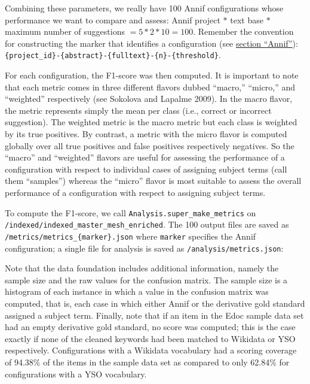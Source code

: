 Combining these parameters, we really have 100 Annif configurations
whose performance we want to compare and assess: Annif project \(*\)
text base \(*\) maximum number of suggestions \(= 5 * 2 * 10 = 100\).
Remember the convention for constructing the marker that identifies a
configuration (see \protect\hyperlink{annif}{section ``Annif''}):
\texttt{\{project\_id\}-\{abstract\}-\{fulltext\}-\{n\}-\{threshold\}}.

For each configuration, the F1-score was then computed. It is important
to note that each metric comes in three different flavors dubbed
``macro,'' ``micro,'' and ``weighted'' respectively (see Sokolova and
Lapalme 2009). In the macro flavor, the metric represents simply the
mean per class (i.e., correct or incorrect suggestion). The weighted
metric is the macro metric but each class is weighted by its true
positives. By contrast, a metric with the micro flavor is computed
globally over all true positives and false positives respectively
negatives. So the ``macro'' and ``weighted'' flavors are useful for
assessing the performance of a configuration with respect to individual
cases of assigning subject terms (call them ``samples'') whereas the
``micro'' flavor is most suitable to assess the overall performance of a
configuration with respect to assigning subject terms.

To compute the F1-score, we call \texttt{Analysis.super\_make\_metrics}
on \texttt{/indexed/indexed\_master\_mesh\_enriched}. The 100 output
files are saved as \texttt{/metrics/metrics\_\{marker\}.json} where
\texttt{marker} specifies the Annif configuration; a single file for
analysis is saved as \texttt{/analysis/metrics.json}:

\begin{Shaded}
\begin{Highlighting}[]
\NormalTok{)}
\end{Highlighting}
\end{Shaded}

Note that the data foundation includes additional information, namely
the sample size and the raw values for the confusion matrix. The sample
size is a histogram of each instance in which a value in the confusion
matrix was computed, that is, each case in which either Annif or the
derivative gold standard assigned a subject term. Finally, note that if
an item in the Edoc sample data set had an empty derivative gold
standard, no score was computed; this is the case exactly if none of the
cleaned keywords had been matched to Wikidata or YSO respectively.
Configurations with a Wikidata vocabulary had a scoring coverage of
94.38\% of the items in the sample data set as compared to only 62.84\%
for configurations with a YSO vocabulary.

